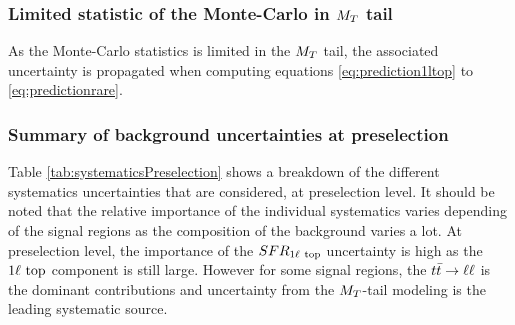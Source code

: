             \subsubsection{Limited statistic of the Monte-Carlo in $M_T$ tail}
            
            As the Monte-Carlo statistics is limited in the $M_T$ tail, the associated uncertainty
            is propagated when computing equations \ref{eq:prediction1ltop} to \ref{eq:predictionrare}.

            \subsubsection{Summary of background uncertainties at preselection}
           
            Table \ref{tab:systematicsPreselection} shows a breakdown of the different systematics
            uncertainties that are considered, at preselection level. It should be noted that the
            relative importance of the individual systematics varies depending of the signal regions
            as the composition of the background varies a lot. At preselection level, the importance
            of the $SFR_{1\ell~\text{top}}$ uncertainty is high as the $1\ell~\text{top}$ component is still large.
            However for some signal regions, the $t\bar{t} \rightarrow \ell \ell$ is the dominant contributions and
            uncertainty from the $M_T$-tail modeling is the leading systematic source.


